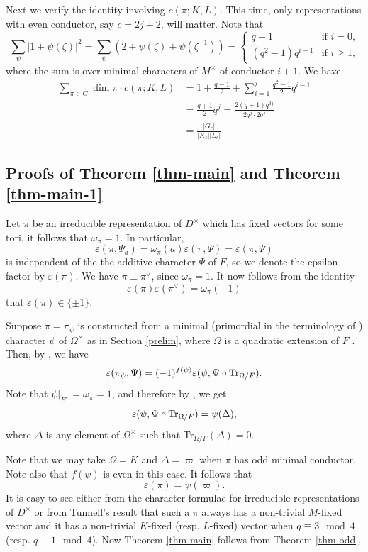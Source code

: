 \documentclass[12pt]{amsart}
\theoremstyle{definition}
\theoremstyle{remark}
\begin{document}
Next we verify the identity involving $c(\pi; K, L)$. This time, only representations with even conductor, say $c = 2j+2$, will matter. Note that
\[\sum_\psi |1+\psi(\zeta)|^2 = \sum_\psi (2+\psi(\zeta)+\psi(\zeta^{-1})) = 
\begin{cases}
q-1 &\text{if $i=0$,} \\
(q^2-1)q^{i-1} &\text{if $i \geq 1$,} 
\end{cases}
\]
where the sum is over minimal characters of $M^\times$ of conductor $i+1$. We have
\begin{align*}
\sum_{\pi \in \widehat{G}} \dim \pi \cdot c(\pi; K, L) &= 1 + \frac{q-1}{2} + \sum_{i=1}^j \frac{q^2-1}{2}q^{i-1} \\
&= \frac{q+1}{2} q^j = \frac{2(q+1)q^{3j}}{2q^j \cdot 2q^j} \\
&=  \frac{|G_c|}{|K_c||L_c|}.
\end{align*}

\subsection{Proofs of Theorem \ref{thm-main} and Theorem \ref{thm-main-1}}\label{proof-main}

Let $\pi$ be an irreducible representation of $D^\times$ which has fixed vectors for some tori, it follows that $\omega_\pi = 1$. In particular, 
\[\varepsilon(\pi,\Psi_a) = \omega_\pi(a) \varepsilon(\pi,\Psi) = \varepsilon(\pi,\Psi)\]
is independent of the the additive character $\Psi$ of $F$, so we denote the epsilon factor by $\varepsilon(\pi)$. We have $\pi \equiv \pi^\vee$, since $\omega_\pi = 1$.  It now follows from the identity
\[\varepsilon(\pi)\varepsilon(\pi^\vee) = \omega_\pi(-1)\] that $\varepsilon(\pi) \in \{\pm 1\}$. 

Suppose $\pi = \pi_\psi$ is constructed from a minimal (primordial in the terminology of \cite{gk80}) character $\psi$ of $\Omega^\times$ as in Section \ref{prelim}, where $\Omega$ is a quadratic extension of $F$ . Then, by \cite[Theorem 3.7 and Proposition 4.5]{gk80}, we have
\[\varepsilon(\pi_\psi,\Psi) = (-1)^{f(\psi)}\varepsilon(\psi, \Psi \circ {\rm Tr}_{\Omega/F}).\] 
Note that $\psi|_{F^\times} = \omega_\pi = 1$, and therefore by \cite[Theorem 3]{fq73}, we get
\[\varepsilon(\psi,\Psi \circ {\rm Tr}_{\Omega/F}) = \psi(\Delta),\]
where $\Delta$ is any element of $\Omega^\times$ such that Tr$_{\Omega/F}(\Delta) = 0$.

Note that we may take $\Omega = K$ and $\Delta = \varpi$ when $\pi$ has odd minimal conductor. Note also that $f(\psi)$ is even in this case. It follows that
\[\varepsilon(\pi) = \psi(\varpi).\]
 It is easy to see either from the character formulae for irreducible representations of $D^\times$ or from Tunnell's result \cite{tun83,sai93} that such a $\pi$ always has a non-trivial $M$-fixed vector and it has a non-trivial $K$-fixed (resp. $L$-fixed) vector when $q \equiv 3 \mod 4$ (resp. $q \equiv 1 \mod 4$). Now Theorem \ref{thm-main} follows from Theorem \ref{thm-odd}.
\end{document}
